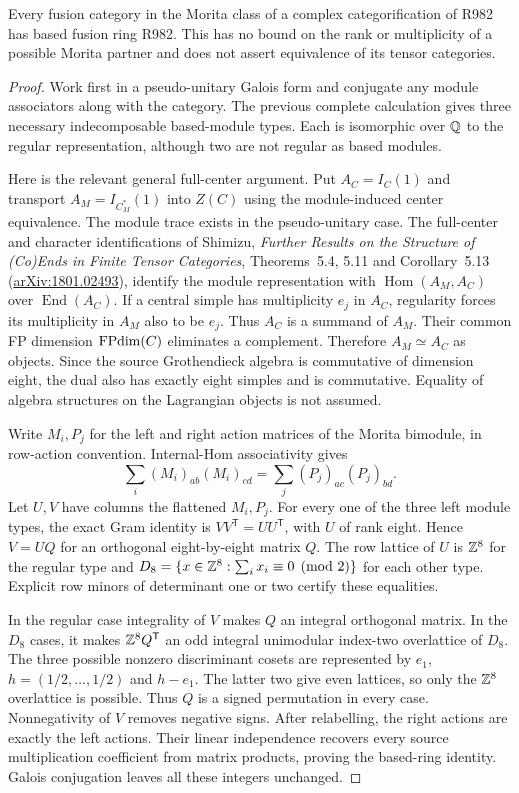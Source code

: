 \begin{proposition}
\label{prop:creative-r982-morita}
Every fusion category in the Morita class of a complex categorification
of R982 has based fusion ring R982. This has no bound on the rank or
multiplicity of a possible Morita partner and does not assert equivalence
of its tensor categories.
\end{proposition}
\begin{proof}
Work first in a pseudo-unitary Galois form and conjugate any module
associators along with the category. The previous complete calculation
gives three necessary indecomposable based-module types. Each is
isomorphic over $\mathbb Q$ to the regular representation, although two are
not regular as based modules.

Here is the relevant general full-center argument. Put
$A_C=I_C(1)$ and transport $A_M=I_{C_M^*}(1)$ into $Z(C)$ using the
module-induced center equivalence. The module trace exists in the
pseudo-unitary case. The full-center and character identifications of
Shimizu, \emph{Further Results on the Structure of (Co)Ends in Finite
Tensor Categories}, Theorems~5.4, 5.11 and Corollary~5.13
(\href{https://arxiv.org/pdf/1801.02493}{arXiv:1801.02493}), identify
the module representation with $\operatorname{Hom}(A_M,A_C)$ over
$\operatorname{End}(A_C)$.
If a central simple has multiplicity $e_j$ in $A_C$, regularity forces
its multiplicity in $A_M$ also to be $e_j$. Thus $A_C$ is a summand
of $A_M$. Their common FP dimension $\operatorname{FPdim}(C)$ eliminates a
complement. Therefore $A_M\simeq A_C$ as objects. Since the source
Grothendieck algebra is commutative of dimension eight, the dual also
has exactly eight simples and is commutative. Equality of algebra
structures on the Lagrangian objects is not assumed.

Write $M_i,P_j$ for the left and right action matrices of the Morita
bimodule, in row-action convention. Internal-Hom associativity gives
\[
 \sum_i(M_i)_{ab}(M_i)_{cd}
       =\sum_j(P_j)_{ac}(P_j)_{bd}.
\]
Let $U,V$ have columns the flattened $M_i,P_j$. For every one of
the three left module types, the exact Gram identity is
$VV^{\mathsf T}=UU^{\mathsf T}$, with $U$ of rank eight.
Hence $V=UQ$ for an orthogonal eight-by-eight matrix $Q$.
The row lattice of $U$ is $\mathbb Z^8$ for the regular type and
$D_8=\{x\in\mathbb Z^8:\sum_i x_i\equiv0\pmod2\}$ for each other
type. Explicit row minors of determinant one or two certify these
equalities.

In the regular case integrality of $V$ makes $Q$ an integral
orthogonal matrix. In the $D_8$ cases, it makes
$\mathbb Z^8Q^{\mathsf T}$ an odd integral unimodular index-two
overlattice of $D_8$. The three possible nonzero discriminant cosets
are represented by $e_1$, $h=(1/2,\ldots,1/2)$ and $h-e_1$.
The latter two give even lattices, so only the $\mathbb Z^8$ overlattice
is possible. Thus $Q$ is a signed permutation in every case.
Nonnegativity of $V$ removes negative signs. After relabelling, the
right actions are exactly the left actions. Their linear independence
recovers every source multiplication coefficient from matrix products,
proving the based-ring identity. Galois conjugation leaves all these
integers unchanged.
\end{proof}

